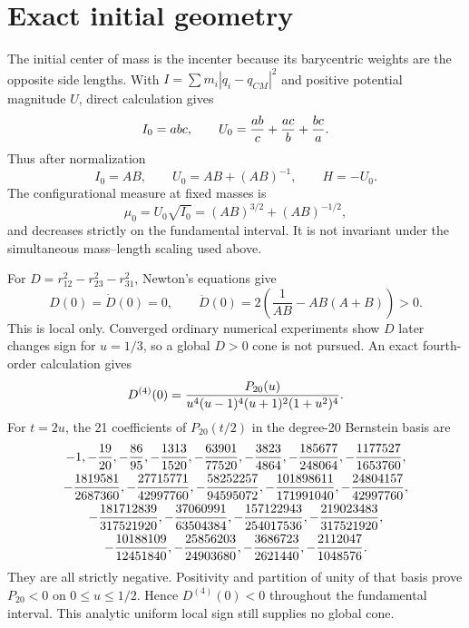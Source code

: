 \documentclass[11pt]{article}
\begin{document}
\section{Exact initial geometry}

The initial center of mass is the incenter because its barycentric weights are
the opposite side lengths.  With $I=\sum m_i|q_i-q_{CM}|^2$ and positive
potential magnitude $U$, direct calculation gives
\[
I_0=abc,\qquad
U_0={ab\over c}+{ac\over b}+{bc\over a}.
\]
Thus after normalization
\[
I_0=AB,\qquad U_0=AB+(AB)^{-1},\qquad H=-U_0.
\]
The configurational measure at fixed masses is
\[
\mu_0=U_0\sqrt{I_0}=(AB)^{3/2}+(AB)^{-1/2},
\]
and decreases strictly on the fundamental interval.  It is not invariant under
the simultaneous mass--length scaling used above.

For $D=r_{12}^2-r_{23}^2-r_{31}^2$, Newton's equations give
\[
D(0)=\dot D(0)=0,\qquad
\ddot D(0)=2\left(\frac1{AB}-AB(A+B)\right)>0.
\]
This is local only.  Converged ordinary numerical experiments show $D$ later
changes sign for $u=1/3$, so a global $D>0$ cone is not pursued.
An exact fourth-order calculation gives
\[
D^{(4)}(0)={P_{20}(u)\over
u^4(u-1)^4(u+1)^2(1+u^2)^4}.
\]
For $t=2u$, the 21 coefficients of $P_{20}(t/2)$ in the degree-20 Bernstein
basis are
\[
\begin{gathered}
-1,-{19\over20},-{86\over95},-{1313\over1520},-{63901\over77520},
-{3823\over4864},-{185677\over248064},-{1177527\over1653760},\\
-{1819581\over2687360},-{27715771\over42997760},
-{58252257\over94595072},-{101898611\over171991040},
-{24804157\over42997760},\\
-{181712839\over317521920},-{37060991\over63504384},
-{157122943\over254017536},-{219023483\over317521920},\\
-{10188109\over12451840},-{25856203\over24903680},
-{3686723\over2621440},-{2112047\over1048576}.
\end{gathered}
\]
They are all strictly negative. Positivity and partition of unity of that
basis prove $P_{20}<0$ on $0\le u\le1/2$. Hence
$D^{(4)}(0)<0$ throughout the fundamental interval.  This analytic uniform
local sign still supplies no global cone.
\end{document}

